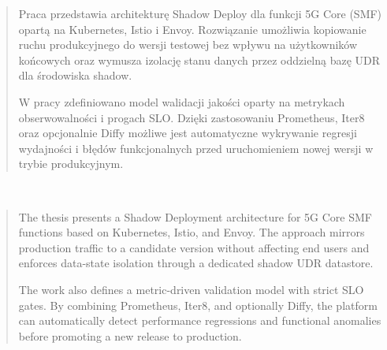 \begin{abstract}
Praca przedstawia architekturę Shadow Deploy dla funkcji 5G Core (SMF) opartą na Kubernetes, Istio i Envoy. Rozwiązanie umożliwia kopiowanie ruchu produkcyjnego do wersji testowej bez wpływu na użytkowników końcowych oraz wymusza izolację stanu danych przez oddzielną bazę UDR dla środowiska shadow.

W pracy zdefiniowano model walidacji jakości oparty na metrykach obserwowalności i progach SLO. Dzięki zastosowaniu Prometheus, Iter8 oraz opcjonalnie Diffy możliwe jest automatyczne wykrywanie regresji wydajności i błędów funkcjonalnych przed uruchomieniem nowej wersji w trybie produkcyjnym.
\end{abstract}
\\ 

{
\begin{abstract}
The thesis presents a Shadow Deployment architecture for 5G Core SMF functions based on Kubernetes, Istio, and Envoy. The approach mirrors production traffic to a candidate version without affecting end users and enforces data-state isolation through a dedicated shadow UDR datastore.

The work also defines a metric-driven validation model with strict SLO gates. By combining Prometheus, Iter8, and optionally Diffy, the platform can automatically detect performance regressions and functional anomalies before promoting a new release to production.
\end{abstract}
}
